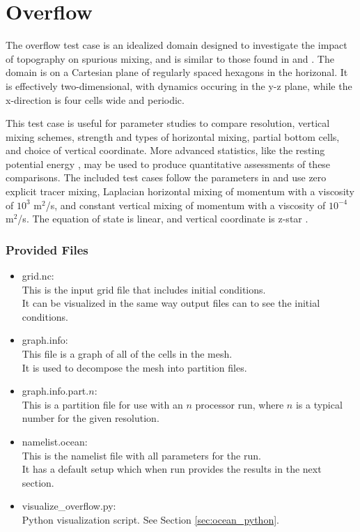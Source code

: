 \section{Overflow}
\label{subsec:overflow_description}
The overflow test case is an idealized domain designed to investigate the impact of topography on spurious mixing, and is similar to those found in \citet{Haidvogel_Beckmann99bk} and \citet[section 4]{Ilicak_ea12om}.  The domain is on a Cartesian plane of regularly spaced hexagons in the horizonal.  It is effectively two-dimensional, with dynamics occuring in the y-z plane, while the x-direction is four cells wide and periodic.  

This test case is useful for parameter studies to compare resolution, vertical mixing schemes, strength and types of horizontal mixing, partial bottom cells, and choice of vertical coordinate.  More advanced statistics, like the resting potential energy \citep{Ilicak_ea12om}, may be used to produce quantitative assessments of these comparisons.  The included test cases follow the parameters in \citet[section 4]{Ilicak_ea12om} and use zero explicit tracer mixing, Laplacian horizontal mixing of momentum with a viscosity of $10^3$ m$^2$/s, and constant vertical mixing of momentum with a viscosity of $10^{-4}$ m$^2$/s.  The equation of state is linear, and vertical coordinate is z-star \citep{Adcroft_Campin04om}.


\subsubsection{Provided Files}
\label{subsubsec:overflow_files}

\begin{itemize}
	\item grid.nc: \\
		This is the input grid file that includes initial conditions.  \\
		It can be visualized in the same way output files can to see the initial conditions.
	\item graph.info: \\
		This file is a graph of all of the cells in the mesh. \\
		It is used to decompose the mesh into partition files.
	\item graph.info.part.$n$: \\
		This is a partition file for use with an $n$ processor run, where $n$ is a typical number for the given resolution.
	\item namelist.ocean: \\
		This is the namelist file with all parameters for the run. \\
		It has a default setup which when run provides the results in the next section.
	\item visualize\_overflow.py: \\
		Python visualization script.  See Section \ref{sec:ocean_python}.
\end{itemize}

